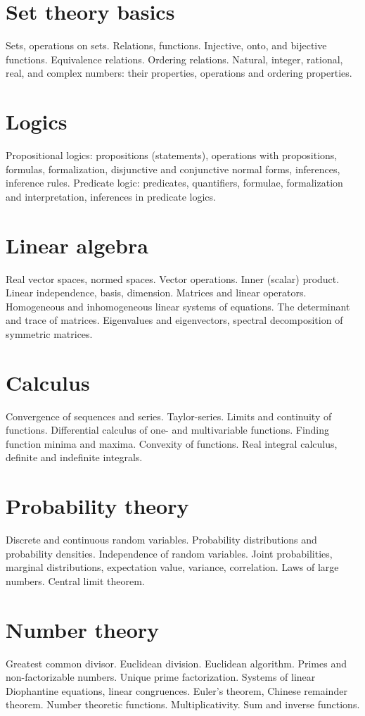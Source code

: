 \documentclass{article}
\begin{document}
\section{Set theory basics}

Sets, operations on sets. Relations, functions. Injective, onto, and bijective functions. Equivalence relations. Ordering relations. Natural, integer, rational, real, and complex numbers: their properties, operations and ordering properties.


\section{Logics}

Propositional logics: propositions (statements), operations with propositions, formulas, formalization, disjunctive and conjunctive normal forms, inferences, inference rules. Predicate logic: predicates, quantifiers, formulae, formalization and interpretation, inferences in predicate logics.


\section{Linear algebra}

Real vector spaces, normed spaces. Vector operations. Inner (scalar) product. Linear independence, basis, dimension. Matrices and linear operators. Homogeneous and inhomogeneous linear systems of equations. The determinant and trace of matrices. Eigenvalues and eigenvectors, spectral decomposition of symmetric matrices.


\section{Calculus}

Convergence of sequences and series. Taylor-series. Limits and continuity of functions. Differential calculus of one- and multivariable functions. Finding function minima and maxima. Convexity of functions. Real integral calculus, definite and indefinite integrals.


\section{Probability theory}

Discrete and continuous random variables. Probability distributions and probability densities. Independence of random variables. Joint probabilities, marginal distributions, expectation value, variance, correlation. Laws of large numbers. Central limit theorem.


\section{Number theory}

Greatest common divisor. Euclidean division. Euclidean algorithm. Primes and non-factorizable numbers. Unique prime factorization. Systems of linear Diophantine equations, linear congruences. Euler’s theorem, Chinese remainder theorem. Number theoretic functions. Multiplicativity. Sum and inverse functions.
\end{document}
